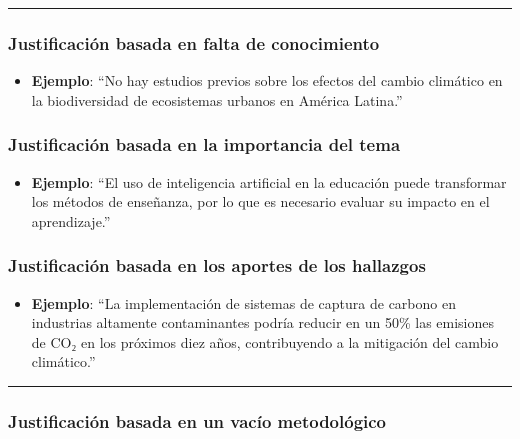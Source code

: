 \documentclass[
  letterpaper,
  DIV=11,
  numbers=noendperiod]{scrartcl}
\providecommand{\tightlist}{%
  \setlength{\itemsep}{0pt}\setlength{\parskip}{0pt}}
\begin{document}
\begin{center}\rule{0.5\linewidth}{0.5pt}\end{center}

\subsubsection{Justificación basada en falta de
conocimiento}\label{justificaciuxf3n-basada-en-falta-de-conocimiento}

\begin{itemize}
\tightlist
\item
  \textbf{Ejemplo}: ``No hay estudios previos sobre los efectos del
  cambio climático en la biodiversidad de ecosistemas urbanos en América
  Latina.''
\end{itemize}

\subsubsection{Justificación basada en la importancia del
tema}\label{justificaciuxf3n-basada-en-la-importancia-del-tema}

\begin{itemize}
\tightlist
\item
  \textbf{Ejemplo}: ``El uso de inteligencia artificial en la educación
  puede transformar los métodos de enseñanza, por lo que es necesario
  evaluar su impacto en el aprendizaje.''
\end{itemize}

\subsubsection{Justificación basada en los aportes de los
hallazgos}\label{justificaciuxf3n-basada-en-los-aportes-de-los-hallazgos}

\begin{itemize}
\tightlist
\item
  \textbf{Ejemplo}: ``La implementación de sistemas de captura de
  carbono en industrias altamente contaminantes podría reducir en un
  50\% las emisiones de CO₂ en los próximos diez años, contribuyendo a
  la mitigación del cambio climático.''
\end{itemize}

\begin{center}\rule{0.5\linewidth}{0.5pt}\end{center}

\subsubsection{Justificación basada en un vacío
metodológico}\label{justificaciuxf3n-basada-en-un-vacuxedo-metodoluxf3gico}
\end{document}
